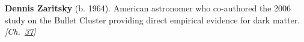 \textbf{Dennis Zaritsky} (b. 1964). American astronomer who co-authored the 2006 study on the Bullet Cluster providing direct empirical evidence for dark matter. \emph{[Ch.~\hyperref[ch:darkmatterevidence]{37}]}

